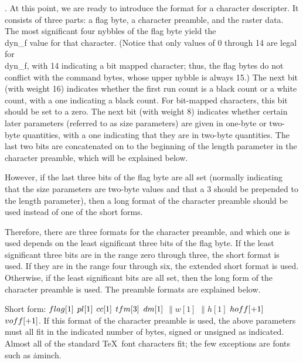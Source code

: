 \fi

. At this point, we are ready to introduce the format for a character
descripter.  It consists of three parts: a flag byte, a character preamble,
and the raster data.  The most significant four nybbles of the flag byte
yield the \\{dyn\_f} value for that character.  (Notice that only values of
0 through 14 are legal for \\{dyn\_f}, with 14 indicating a bit mapped
character;
thus, the flag bytes do not conflict with the command bytes, whose upper nybble
is always 15.)  The next bit (with weight 16) indicates whether the first run
count is a black count or a white count, with a one indicating a black count.
For bit-mapped characters, this bit should be set to a zero.  The next bit
(with weight 8) indicates whether certain later parameters (referred to as size
parameters) are given in one-byte or two-byte quantities, with a one indicating
that they are in two-byte quantities.  The last two bits are concatenated on to
the beginning of the length parameter in the character preamble, which will be
explained below.

However, if the last three bits of the flag byte are all set (normally
indicating that the size parameters are two-byte values and that a 3 should be
prepended to the length parameter), then a long format of the character
preamble should be used instead of one of the short forms.

Therefore, there are three formats for the character preamble, and which one
is used depends on the least significant three bits of the flag byte.  If the
least significant three bits are in the range zero through three, the short
format is used.  If they are in the range four through six, the extended short
format is used.  Otherwise, if the least significant bits are all set, then
the long form of the character preamble is used.  The preamble formats are
explained below.

\yskip\hang Short form: $\\{flag}[1]$ $\\{pl}[1]$ $\\{cc}[1]$ $\\{tfm}[3]$ $%
\\{dm}[1]$ $\|w[1]$
$\|h[1]$ $\\{hoff}[+1]$ $\\{voff}[+1]$.
If this format of the character preamble is used, the above
parameters must all fit in the indicated number of bytes, signed or unsigned
as indicated.  Almost all of the standard \TeX\ font characters fit; the few
exceptions are fonts such as \.{aminch}.

